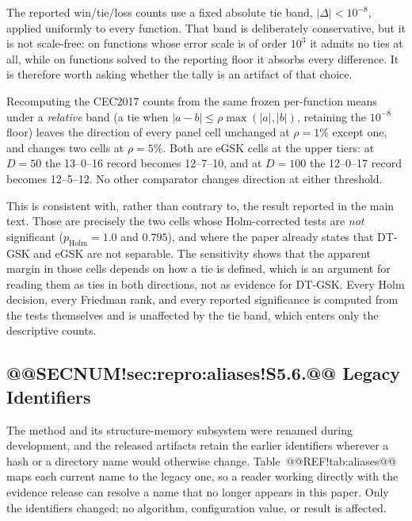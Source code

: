 \documentclass[10pt,a4paper]{article}
\newcommand{\dtgsk}{DT-GSK}
\newcommand{\egsk}{eGSK}
\begin{document}
The reported win/tie/loss counts use a fixed absolute tie band,
$|\Delta| < 10^{-8}$, applied uniformly to every function. That band is
deliberately conservative, but it is not scale-free: on functions whose error
scale is of order $10^{3}$ it admits no ties at all, while on functions solved to
the reporting floor it absorbs every difference. It is therefore worth asking
whether the tally is an artifact of that choice.

Recomputing the CEC2017 counts from the same frozen per-function means under a
\emph{relative} band (a tie when
$|a-b| \le \rho \max(|a|,|b|)$, retaining the $10^{-8}$ floor) leaves the
direction of every panel cell unchanged at $\rho = 1\%$ except one, and changes
two cells at $\rho = 5\%$. Both are \egsk{} cells at the upper tiers: at
$D = 50$ the 13--0--16 record becomes 12--7--10, and at $D = 100$ the 12--0--17
record becomes 12--5--12. No other comparator changes direction at either
threshold.

This is consistent with, rather than contrary to, the result reported in the main
text. Those are precisely the two cells whose Holm-corrected tests are \emph{not}
significant ($p_{\mathrm{Holm}} = 1.0$ and $0.795$), and where the paper already
states that \dtgsk{} and \egsk{} are not separable. The sensitivity shows that
the apparent margin in those cells depends on how a tie is defined, which is an
argument for reading them as ties in both directions, not as evidence for
\dtgsk{}. Every Holm decision, every Friedman rank, and every reported
significance is computed from the tests themselves and is unaffected by the tie
band, which enters only the descriptive counts.


\subsection{@@SECNUM!sec:repro:aliases!S5.6.@@ Legacy Identifiers}\label{sec:repro:aliases}

The method and its structure-memory subsystem were renamed during development,
and the released artifacts retain the earlier identifiers wherever a hash or a
directory name would otherwise change. Table~@@REF!tab:aliases@@ maps each current
name to the legacy one, so a reader working directly with the evidence release
can resolve a name that no longer appears in this paper. Only the identifiers
changed; no algorithm, configuration value, or result is affected.
\end{document}

